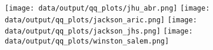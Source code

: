 \documentclass[a4paper]{article}
\begin{document}
\begin{figure}
\texttt{[image: data/output/qq\_plots/jhu\_abr.png]}
\texttt{[image: data/output/qq\_plots/jackson\_aric.png]}
\texttt{[image: data/output/qq\_plots/jackson\_jhs.png]}
\texttt{[image: data/output/qq\_plots/winston\_salem.png]}
\end{figure}
\end{document}
